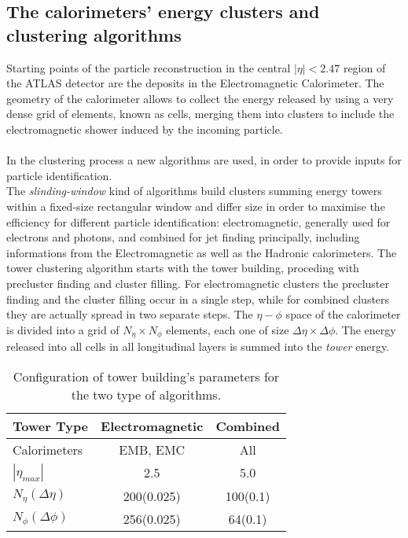 \subsection{The calorimeters' energy clusters and clustering algorithms}
Starting points of the particle reconstruction in the central $|\eta| < 2.47$ region of the ATLAS detector are the deposits in the Electromagnetic Calorimeter. The geometry of the calorimeter allows to collect the energy released by using a very dense grid of elements, known as cells, merging them into clusters to include the electromagnetic shower induced by the incoming particle.
\\\\
In the clustering process a new algorithms are used, in order to provide inputs for particle identification.
\\\phantom{1}\hspace{0.3cm} The \emph{slinding-window} \cite{Lampl_1099735} kind of algorithms build clusters summing energy towers within a fixed-size rectangular window and differ size in order to maximise the efficiency for different particle identification: electromagnetic, generally used for electrons and photons, and combined for jet finding principally, including informations from the Electromagnetic as well as the Hadronic calorimeters. The tower clustering algorithm starts with the tower building, proceding with precluster finding and cluster filling. For electromagnetic clusters the precluster finding and the cluster filling occur in a single step, while for combined clusters they are actually spread in two separate steps. The $\eta - \phi$ space of the calorimeter is divided into a grid of $N_{\eta} \times N_{\phi}$ elements, each one of size $\Delta \eta \times \Delta \phi$. The energy released into all cells in all longitudinal layers is summed into the \emph{tower} energy.
\begin{table}[h]
\caption{Configuration of tower building's parameters for the two type of algorithms.}
\begin{center}
\begin{tabular}{ l | c | c }
  \hline			
  Tower Type & Electromagnetic & Combined \\
  \hline
  Calorimeters & EMB, EMC & All \\
  \hline
  $|\eta_{max}|$ & 2.5 & 5.0 \\
  \hline
  $N_{\eta}(\Delta \eta)$ & 200(0.025) & 100(0.1) \\
  \hline  
  $N_{\phi}(\Delta \phi)$ & 256(0.025) & 64(0.1) \\
  \hline
\end{tabular}
\end{center}
\end{table}
